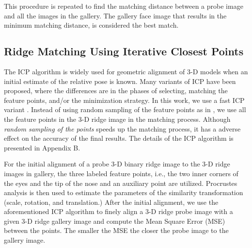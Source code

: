 This procedure is repeated to find the matching distance between a
probe image and all the images in the gallery. The gallery face
image that results in the minimum matching distance, is considered
the best match.

\subsection{Ridge Matching Using Iterative Closest Points}
The ICP algorithm is widely used for geometric alignment of 3-D
models when an initial estimate of the relative pose is known. Many
variants of ICP have been proposed, where the differences are in the
phases of selecting, matching the feature points, and/or the
minimization strategy. In this work, we use a fast ICP variant
\cite{Rusinkiewicz_01}. Instead of using random sampling of the
feature points as in \cite{Rusinkiewicz_01}, we use all the feature
points in the 3-D ridge image in the matching process. Although
\textit{random sampling of the points} speeds up the matching
process, it has a adverse effect on the accuracy of the final
results. The details of the ICP algorithm is presented in Appendix
B.

For the initial alignment of a probe 3-D binary ridge image to the
3-D ridge images in gallery, the three labeled feature points, i.e.,
the two inner corners of the eyes and the tip of the nose and an
auxiliary point are utilized. Procrustes analysis \cite{procrustes}
is then used to estimate the parameters of the similarity
transformation (scale, rotation, and translation.) After the initial
alignment, we use the aforementioned ICP algorithm to finely align a
3-D ridge probe image with a given 3-D ridge gallery image and
compute the Mean Square Error (MSE) between the points. The smaller
the MSE the closer the probe image to the gallery image.

